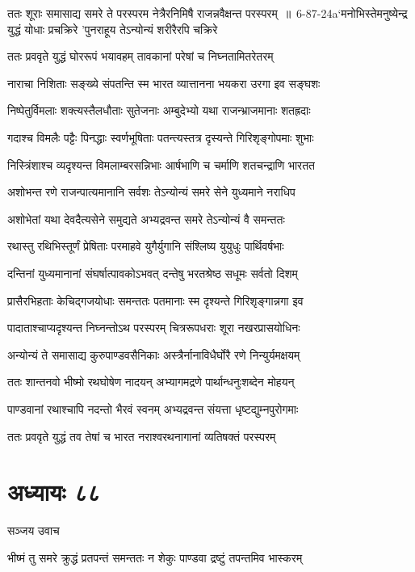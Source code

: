 \threelineshloka
{ततः शूराः समासाद्य समरे ते परस्परम}
{नेत्रैरनिमिषै राजन्नवैक्षन्त परस्परम् ॥ 6-87-24a`मनोभिस्तेमनुष्येन्द्र युद्धं योधाः प्रचक्रिरे}
{'पुनराहूय तेऽन्योन्यं शरीरैरपि चक्रिरे}


\twolineshloka
{ततः प्रववृते युद्धं घोररूपं भयावहम्}
{तावकानां परेषां च निघ्नतामितरेतरम्}


\twolineshloka
{नाराचा निशिताः सङ्ख्ये संपतन्ति स्म भारत}
{व्यात्तानना भयकरा उरगा इव सङ्घशः}


\twolineshloka
{निष्पेतुर्विमलाः शक्त्यस्तैलधौताः सुतेजनाः}
{अम्बुदेभ्यो यथा राजन्भ्राजमानाः शतह्रदाः}


\twolineshloka
{गदाश्च विमलैः पट्टैः पिनद्धाः स्वर्णभूषिताः}
{पतन्त्यस्तत्र दृस्यन्ते गिरिशृङ्गोपमाः शुभाः}


\twolineshloka
{निस्त्रिंशाश्च व्यदृश्यन्त विमलाम्बरसन्निभाः}
{आर्षभाणि च चर्माणि शतचन्द्राणि भारतत}


\twolineshloka
{अशोभन्त रणे राजन्पात्यमानानि सर्वशः}
{तेऽन्योन्यं समरे सेने युध्यमाने नराधिप}


\twolineshloka
{अशोभेतां यथा देवदैत्यसेने समुद्यते}
{अभ्यद्रवन्त समरे तेऽन्योन्यं वै समन्ततः}


\twolineshloka
{रथास्तु रथिभिस्तूर्णं प्रेषिताः परमाहवे}
{युगैर्युगानि संश्लिष्य युयुधुः पार्थिवर्षभाः}


\twolineshloka
{दन्तिनां युध्यमानानां संघर्षात्पावकोऽभवत्}
{दन्तेषु भरतश्रेष्ठ सधूमः सर्वतो दिशम्}


\twolineshloka
{प्रासैरभिहताः केचिद्गजयोधाः समन्ततः}
{पतमानाः स्म दृश्यन्ते गिरिशृङ्गान्नगा इव}


\twolineshloka
{पादाताश्चाप्यदृश्यन्त निघ्नन्तोऽथ परस्परम्}
{चित्ररूपधराः शूरा नखरप्रासयोधिनः}


\twolineshloka
{अन्योन्यं ते समासाद्य कुरुपाण्डवसैनिकाः}
{अस्त्रैर्नानाविधैर्घोरै रणे निन्युर्यमक्षयम्}


\twolineshloka
{ततः शान्तनवो भीष्मो रथघोषेण नादयन्}
{अभ्यागमद्रणे पार्थान्धनुःशब्देन मोहयन्}


\twolineshloka
{पाण्डवानां रथाश्चापि नदन्तो भैरवं स्वनम्}
{अभ्यद्रवन्त संयत्ता धृष्टद्युम्नपुरोगमाः}


\twolineshloka
{ततः प्रववृते युद्धं तव तेषां च भारत}
{नराश्वरथनागानां व्यतिषक्तं परस्परम्}


\chapter{अध्यायः ८८}
\twolineshloka
{सञ्जय उवाच}
{}


\twolineshloka
{भीष्मं तु समरे क्रुद्धं प्रतपन्तं समन्ततः}
{न शेकुः पाण्डवा द्रष्टुं तपन्तमिव भास्करम्}


